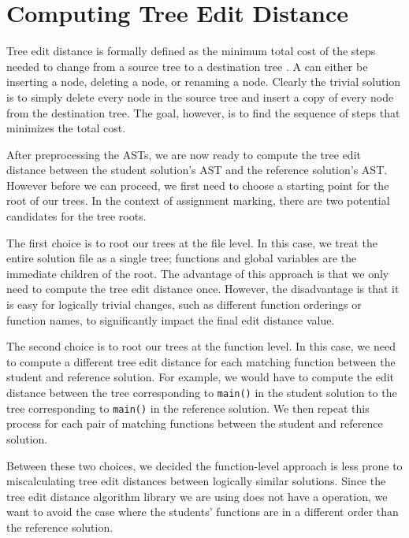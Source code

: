 \section{Computing Tree Edit Distance}

Tree edit distance is formally defined as the minimum total cost of the steps needed to change from a source tree to a destination tree \cite{bille2005survey}. A  can either be inserting a node, deleting a node, or renaming a node. Clearly the trivial solution is to simply delete every node in the source tree and insert a copy of every node from the destination tree. The goal, however, is to find the sequence of steps that minimizes the total cost.

After preprocessing the ASTs, we are now ready to compute the tree edit distance between the student solution's AST and the reference solution's AST. However before we can proceed, we first need to choose a starting point for the root of our trees. In the context of assignment marking, there are two potential candidates for the tree roots.

The first choice is to root our trees at the file level. In this case, we treat the entire solution file as a single tree; functions and global variables are the immediate children of the root. The advantage of this approach is that we only need to compute the tree edit distance once. However, the disadvantage is that it is easy for logically trivial changes, such as different function orderings or function names, to significantly impact the final edit distance value.

The second choice is to root our trees at the function level. In this case, we need to compute a different tree edit distance for each matching function between the student and reference solution. For example, we would have to compute the edit distance between the tree corresponding to \texttt{main()} in the student solution to the tree corresponding to \texttt{main()} in the reference solution. We then repeat this process for each pair of matching functions between the student and reference solution.

Between these two choices, we decided the function-level approach is less prone to miscalculating tree edit distances between logically similar solutions. Since the tree edit distance algorithm library we are using does not have a  operation, we want to avoid the case where the students' functions are in a different order than the reference solution.

